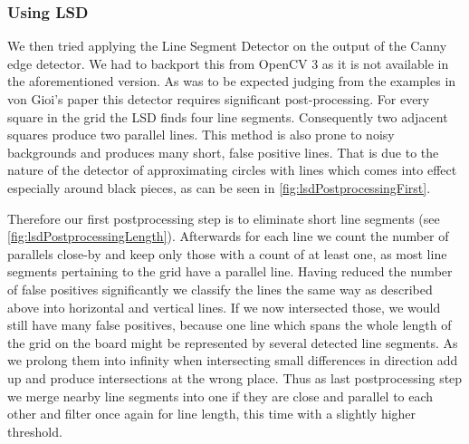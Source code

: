	\subsubsection{Using LSD}
	\label{detector-visible-lsd}
	We then tried applying the Line Segment Detector \cite{von2012lsd} on the output of the Canny edge detector. We had to backport this from OpenCV 3 as it is not available in the aforementioned version. As was to be expected judging from the examples in von Gioi's paper this detector requires significant post-processing. For every square in the grid the LSD finds four line segments. Consequently two adjacent squares produce two parallel lines. This method is also prone to noisy backgrounds and produces many short, false positive lines. That is due to the nature of the detector of approximating circles with lines which comes into effect especially around black pieces, as can be seen in \autoref{fig:lsdPostprocessingFirst}.

	Therefore our first postprocessing step is to eliminate short line segments (see \autoref{fig:lsdPostprocessingLength}). Afterwards for each line we count the number of parallels close-by and keep only those with a count of at least one, as most line segments pertaining to the grid have a parallel line. Having reduced the number of false positives significantly we classify the lines the same way as described above into horizontal and vertical lines. If we now intersected those, we would still have many false positives, because one line which spans the whole length of the grid on the board might be represented by several detected line segments. As we prolong them into infinity when intersecting small differences in direction add up and produce intersections at the wrong place. Thus as last postprocessing step we merge nearby line segments into one if they are close and parallel to each other and filter once again for line length, this time with a slightly higher threshold.

